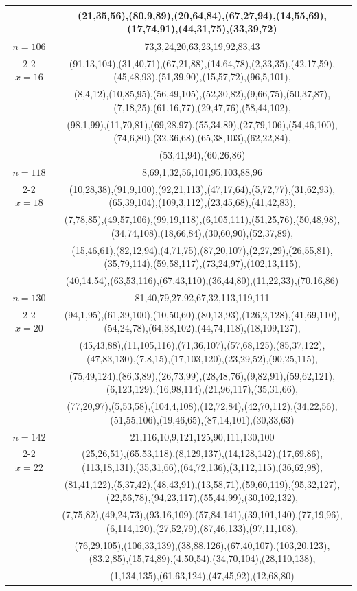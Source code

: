\begin{tabular}{| c | c |}
&(21,35,56),(80,9,89),(20,64,84),(67,27,94),(14,55,69),(17,74,91),(44,31,75),(33,39,72)\\
\hline 
\(n=106\) & 
73,3,24,20,63,23,19,92,83,43\\
\cline{2-2}
\(x=16\)
&(91,13,104),(31,40,71),(67,21,88),(14,64,78),(2,33,35),(42,17,59),(45,48,93),(51,39,90),(15,57,72),(96,5,101),\\
&(8,4,12),(10,85,95),(56,49,105),(52,30,82),(9,66,75),(50,37,87),(7,18,25),(61,16,77),(29,47,76),(58,44,102),\\
&(98,1,99),(11,70,81),(69,28,97),(55,34,89),(27,79,106),(54,46,100),(74,6,80),(32,36,68),(65,38,103),(62,22,84),\\
&(53,41,94),(60,26,86)\\
\hline 
\(n=118\) & 
8,69,1,32,56,101,95,103,88,96\\
\cline{2-2}
\(x=18\)
&(10,28,38),(91,9,100),(92,21,113),(47,17,64),(5,72,77),(31,62,93),(65,39,104),(109,3,112),(23,45,68),(41,42,83),\\
&(7,78,85),(49,57,106),(99,19,118),(6,105,111),(51,25,76),(50,48,98),(34,74,108),(18,66,84),(30,60,90),(52,37,89),\\
&(15,46,61),(82,12,94),(4,71,75),(87,20,107),(2,27,29),(26,55,81),(35,79,114),(59,58,117),(73,24,97),(102,13,115),\\
&(40,14,54),(63,53,116),(67,43,110),(36,44,80),(11,22,33),(70,16,86)\\
\hline 
\(n=130\) & 
81,40,79,27,92,67,32,113,119,111\\
\cline{2-2}
\(x=20\)
&(94,1,95),(61,39,100),(10,50,60),(80,13,93),(126,2,128),(41,69,110),(54,24,78),(64,38,102),(44,74,118),(18,109,127),\\
&(45,43,88),(11,105,116),(71,36,107),(57,68,125),(85,37,122),(47,83,130),(7,8,15),(17,103,120),(23,29,52),(90,25,115),\\
&(75,49,124),(86,3,89),(26,73,99),(28,48,76),(9,82,91),(59,62,121),(6,123,129),(16,98,114),(21,96,117),(35,31,66),\\
&(77,20,97),(5,53,58),(104,4,108),(12,72,84),(42,70,112),(34,22,56),(51,55,106),(19,46,65),(87,14,101),(30,33,63)\\
\hline 
\(n=142\) & 
21,116,10,9,121,125,90,111,130,100\\
\cline{2-2}
\(x=22\)
&(25,26,51),(65,53,118),(8,129,137),(14,128,142),(17,69,86),(113,18,131),(35,31,66),(64,72,136),(3,112,115),(36,62,98),\\
&(81,41,122),(5,37,42),(48,43,91),(13,58,71),(59,60,119),(95,32,127),(22,56,78),(94,23,117),(55,44,99),(30,102,132),\\
&(7,75,82),(49,24,73),(93,16,109),(57,84,141),(39,101,140),(77,19,96),(6,114,120),(27,52,79),(87,46,133),(97,11,108),\\
&(76,29,105),(106,33,139),(38,88,126),(67,40,107),(103,20,123),(83,2,85),(15,74,89),(4,50,54),(34,70,104),(28,110,138),\\
&(1,134,135),(61,63,124),(47,45,92),(12,68,80)\\
\hline 
\end{tabular}